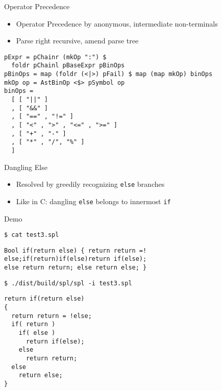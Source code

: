 \documentclass{beamer}
\begin{document}
\begin{frame}[fragile]{Operator Precedence}

\begin{itemize}
  \item Operator Precedence by anonymous, intermediate non-terminals
  \item Parse right recursive, amend parse tree
\end{itemize}

\begin{verbatim}
pExpr = pChainr (mkOp ":") $
  foldr pChainl pBaseExpr pBinOps
pBinOps = map (foldr (<|>) pFail) $ map (map mkOp) binOps
mkOp op = AstBinOp <$> pSymbol op
binOps =
  [ [ "||" ]
  , [ "&&" ]
  , [ "==" , "!=" ]
  , [ "<" , ">" , "<=" , ">=" ]
  , [ "+" , "-" ]
  , [ "*" , "/", "%" ]
  ]
\end{verbatim}

\end{frame}


\begin{frame}{Dangling Else}

\begin{itemize}
  \item Resolved by greedily recognizing \texttt{else} branches
  \item Like in C: dangling \texttt{else} belongs to innermost \texttt{if}
\end{itemize}

\end{frame}


\begin{frame}[fragile]{Demo}
\onslide<+->
\begin{verbatim}
$ cat test3.spl
\end{verbatim}
\onslide<+->
\begin{verbatim}
Bool if(return else) { return return =!
else;if(return)if(else)return if(else);
else return return; else return else; }
\end{verbatim}
\onslide<+->
\begin{verbatim}
$ ./dist/build/spl/spl -i test3.spl
\end{verbatim}
\onslide<+->
\begin{verbatim}
return if(return else)
{
  return return = !else;
  if( return )
    if( else )
      return if(else);
    else
      return return;
  else
    return else;
}
\end{verbatim}
\end{frame}
\end{document}
